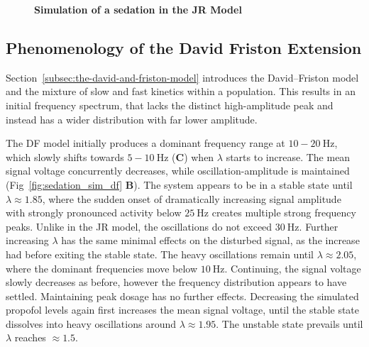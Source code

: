 \begin{figure}[H]

\caption{\textbf{Simulation of a sedation in the JR Model}
}\label{fig:sedation_sim_jr}
\end{figure}

\toggletrue{drawLocRoc}
\def\simRunName{DF_LONGER_INIT}
\def\locStart{1.85}
\def\locST{16.17}
\def\locEnd{2.05}
\def\locET{18.72}
\def\rocStart{1.95}
\def\rocST{49.3}
\def\rocEnd{1.5}
\def\rocET{55.03}
\subsection{Phenomenology of the David Friston Extension}
    Section~\ref{subsec:the-david-and-friston-model} introduces the David--Friston model and
    the mixture of slow and fast kinetics within a population.
    This results in an initial frequency spectrum,
    that lacks the distinct high-amplitude peak and instead has a wider distribution with far lower amplitude.

    The DF model initially produces a dominant frequency range at $10-20 \SI{}{\hertz} $,
    which slowly shifts towards $ 5-10 \SI{}{\hertz} $ (\textbf{C}) when $\lambda$ starts to increase.
    The mean signal voltage concurrently decreases,
    while oscillation-amplitude is maintained (Fig~\ref{fig:sedation_sim_df} \textbf{B}).
    The system appears to be in a stable state until $ \lambda \approx \locStart $,
    where the sudden onset of dramatically
    increasing signal amplitude with strongly pronounced activity below $ \SI{25}{\hertz} $
    creates multiple strong frequency peaks.
    Unlike in the JR model, the oscillations do not exceed  $ \SI{30}{\hertz} $.
    Further increasing $\lambda$ has the same minimal effects on the disturbed signal,
    as the increase had before exiting the stable state.
    The heavy oscillations remain until $\lambda \approx \locEnd $,
    where the dominant frequencies move below $\SI{10}{\hertz}$.
    Continuing, the signal voltage slowly decreases as before,
    however the frequency distribution appears to have settled.
    Maintaining peak dosage has no further effects.
    Decreasing the simulated propofol levels again first increases the mean signal voltage,
    until the stable state dissolves into heavy oscillations around $\lambda \approx \rocStart$.
    The unstable state prevails until $\lambda$ reaches $\approx \rocEnd$.



